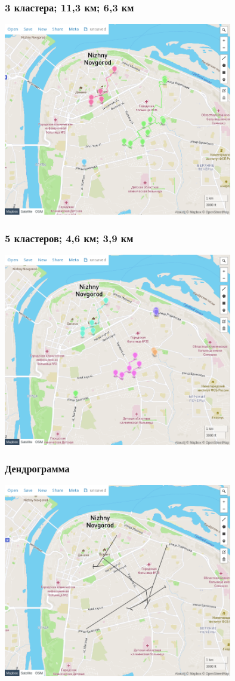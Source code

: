 \documentclass{beamer}
\begin{document}
\begin{frame}
	\frametitle{3 кластера; 11,3 км; 6,3 км}
	\centering
	\includegraphics[width=0.75\textwidth]{k3}
\end{frame}

\begin{frame}
	\frametitle{5 кластеров; 4,6 км; 3,9 км}
	\centering
	\includegraphics[width=0.75\textwidth]{k5}
\end{frame}

\begin{frame}
	\frametitle{Дендрограмма}
	\centering
	\includegraphics[width=0.75\textwidth]{dendrogram}
\end{frame}
\end{document}
